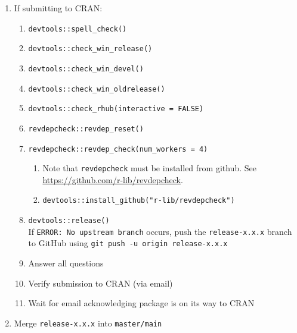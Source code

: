 \documentclass{article}
\begin{document}
\begin{enumerate}

  \item If submitting to CRAN:
  
	\begin{enumerate}
	  
	  \item \verb+devtools::spell_check()+

	  \item \verb+devtools::check_win_release()+
	  
	  \item \verb+devtools::check_win_devel()+

      \item \verb+devtools::check_win_oldrelease()+

	  \item \verb+devtools::check_rhub(interactive = FALSE)+

	  \item \verb+revdepcheck::revdep_reset()+

      \item \verb+revdepcheck::revdep_check(num_workers = 4)+
      \begin{enumerate}

        \item Note that \texttt{revdepcheck} must be installed from github. 
              See \url{https://github.com/r-lib/revdepcheck}.

	    \item \verb+devtools::install_github("r-lib/revdepcheck")+

      \end{enumerate}

	  \item \verb+devtools::release()+ \\
            If \texttt{ERROR: No upstream branch} occurs, 
            push the \texttt{release-x.x.x} branch to GitHub using
            \texttt{git push -u origin release-x.x.x}
        
      \item Answer all questions
      
      \item Verify submission to CRAN (via email)
	  
	  \item Wait for email acknowledging package is on its way to CRAN
            
	\end{enumerate}
  \item Merge \texttt{release-x.x.x} into \texttt{master/main}
  \begin{enumerate}


\end{enumerate}
\end{enumerate}
\end{document}
